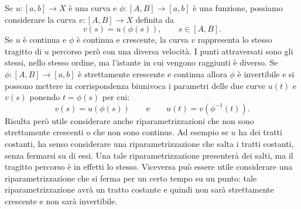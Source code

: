 Se $u\colon [a,b] \to X$ è una curva e $\phi\colon [A,B] \to [a,b]$ è una funzione, 
possiamo considerare la curva $v\colon [A,B] \to X$ definita da
\[
  v(s) = u(\phi(s)), \qquad s\in [A,B].
\]
Se $u$ è continua e $\phi$ è continua e crescente, la curva $v$ rappresenta 
lo stesso tragitto di $u$ percorso però con una diversa velocità. 
I punti attraversati sono gli stessi, nello stesso ordine, ma l'istante in cui 
vengono raggiunti è diverso.
Se $\phi:[A,B] \to [a,b]$ è strettamente crescente e continua
allora $\phi$ è invertibile e si possono mettere in corrispondenza biunivoca 
i parametri delle due curve $u(t)$ e $v(s)$ ponendo $t=\phi(s)$ per cui:
\[
  v(s) = u(\phi(s)) \qquad \text{e} \qquad u(t) = v(\phi^{-1}(t)).
\]
Risulta però utile considerare anche riparametrizzazioni che non sono 
strettamente crescenti o che non sono continue.
Ad esempio se $u$ ha dei tratti costanti, ha senso considerare una riparametrizzazione 
che salta i tratti costanti, senza fermarsi su di essi. 
Una tale riparametrizzazione presenterà dei salti, 
ma il tragitto percorso è in effetti lo stesso. 
Viceversa può essere utile considerare una riparametrizzazione che si ferma 
per un certo tempo su un punto: tale riparametrizzazione avrà un tratto costante 
e quindi non sarà strettamente crescente e non sarà invertibile.

